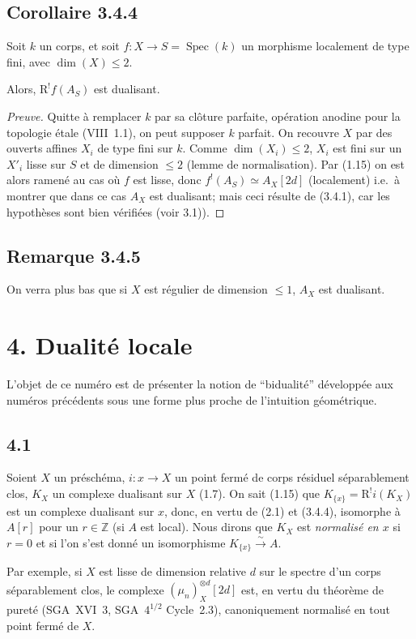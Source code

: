 \documentclass[11pt]{article}
\DeclareMathOperator{\Spec}{Spec}
\newcommand{\R}{\mathrm{R}}
\newcommand{\Z}{\mathbb{Z}}
\providecommand{\R}{\mathrm R}
\providecommand{\Z}{\mathbb Z}
\providecommand{\Spec}{\operatorname{Spec}}
\providecommand{\Spec}{\operatorname{Spec}}
\providecommand{\Spec}{\operatorname{Spec}}
\providecommand{\Spec}{\operatorname{Spec}}
\begin{document}
\subsection*{Corollaire 3.4.4}
Soit $k$ un corps, et soit $f : X \to S = \Spec(k)$ un morphisme localement de type fini, avec $\dim(X) \leqslant 2$.

Alors, $\R^{!}f(A_S)$ est dualisant.

\begin{proof}[Preuve]
Quitte à remplacer $k$ par sa clôture parfaite, opération anodine pour la topologie étale (VIII~1.1), on peut supposer $k$ parfait. On recouvre $X$ par des ouverts affines $X_i$ de type fini sur $k$. Comme $\dim(X_i) \leqslant 2$, $X_i$ est fini sur un $X'_i$ lisse sur $S$ et de dimension $\leqslant 2$ (lemme de normalisation). Par (1.15) on est alors ramené au cas où $f$ est lisse, donc $f^{!}(A_S) \simeq A_X[2d]$ (localement) i.e.~à montrer que dans ce cas $A_X$ est dualisant; mais ceci résulte de (3.4.1), car les hypothèses sont bien vérifiées (voir 3.1)).
\end{proof}

\subsection*{Remarque 3.4.5}
On verra plus bas que si $X$ est régulier de dimension $\leqslant 1$, $A_X$ est dualisant.

\section*{4. Dualité locale}

L'objet de ce numéro est de présenter la notion de ``bidualité'' développée aux numéros précédents sous une forme plus proche de l'intuition géométrique.

\subsection*{4.1}
Soient $X$ un préschéma, $i:x\to X$ un point fermé de corps résiduel séparablement clos, $K_X$ un complexe dualisant sur $X$ (1.7). On sait (1.15) que $K_{\{x\}}=\R^{!}i(K_X)$ est un complexe dualisant sur $x$, donc, en vertu de (2.1) et (3.4.4), isomorphe à $A[r]$ pour un $r\in\Z$ (si $A$ est local). Nous dirons que $K_X$ est \emph{normalisé en $x$} si $r=0$ et si l'on s'est donné un isomorphisme $K_{\{x\}}\xrightarrow{\sim}A$.

Par exemple, si $X$ est lisse de dimension relative $d$ sur le spectre d'un corps séparablement clos, le complexe $(\mu_n)_X^{\otimes d}[2d]$ est, en vertu du théorème de pureté (SGA~XVI~3, SGA~$4^{1/2}$ Cycle~2.3), canoniquement normalisé en tout point fermé de $X$.
\end{document}
